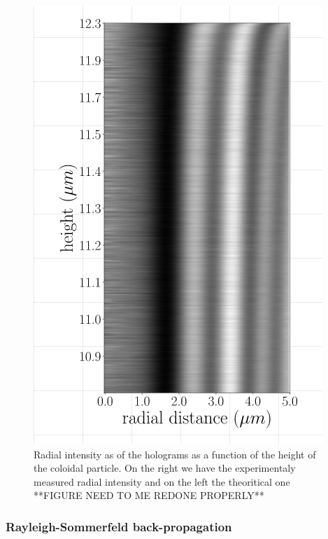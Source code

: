 \begin{figure}
	\centering
	\includegraphics{02_body/chapter2/images/demo_Iz.png}
	\caption{Radial intensity as of the holograms as a function of the height of the coloidal particle. On the right we have the experimentaly measured radial intensity and on the left the theoritical one **FIGURE NEED TO ME REDONE PROPERLY**}
\end{figure}
\subsubsection{ Rayleigh-Sommerfeld back-propagation}


